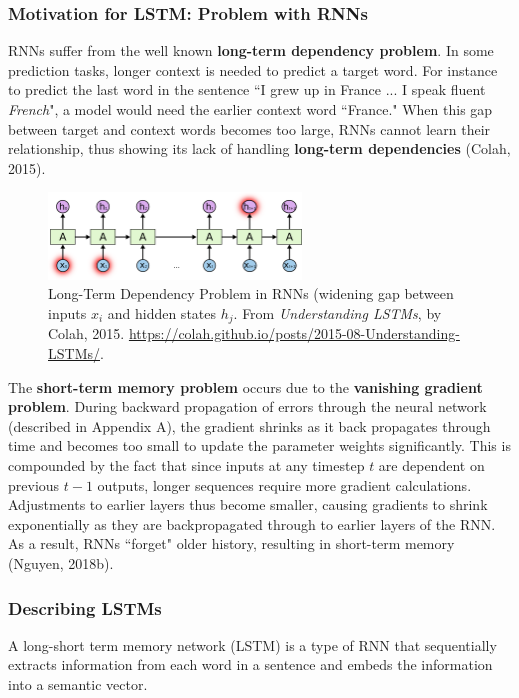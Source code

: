 \subsubsection{Motivation for LSTM: Problem with RNNs}

RNNs suffer from the well known \textbf{long-term dependency problem}. In some prediction tasks, longer context is needed to predict a target word. For instance to predict the last word in the sentence ``I grew up in France ... I speak fluent \emph{French}", a model would need the earlier context word ``France." When this gap between target and context words becomes too large, RNNs cannot learn their relationship, thus showing its lack of handling \textbf{long-term dependencies} (Colah, 2015). 

\begin{figure}[h]
\vspace{-5pt}
\centering
\includegraphics[width=0.6\textwidth]{imgs/rnn_longterm.png}
\vspace{-5pt}
\caption{\footnotesize Long-Term Dependency Problem in RNNs (widening gap between inputs $x_i$ and hidden states $h_j$. From \emph{Understanding LSTMs}, by Colah, 2015. \url{https://colah.github.io/posts/2015-08-Understanding-LSTMs/}. }
\vspace{-5pt}
\label{fig:longTermMemoryProblem}
\end{figure}

The \textbf{short-term memory problem} occurs due to the \textbf{vanishing gradient problem}. During backward propagation of errors through the neural network (described in Appendix A), the gradient shrinks as it back propagates through time and becomes too small to update the parameter weights significantly. This is compounded by the fact that since inputs at any timestep $t$ are dependent on previous $t-1$ outputs, longer sequences require more gradient calculations. Adjustments to earlier layers thus become smaller, causing gradients to shrink exponentially as they are backpropagated through to earlier layers of the RNN. As a result, RNNs ``forget" older history, resulting in short-term memory (Nguyen, 2018b). 


\subsubsection{Describing LSTMs}
A long-short term memory network (LSTM) is a type of RNN that sequentially extracts information from each word in a sentence and embeds the information into a semantic vector. 

